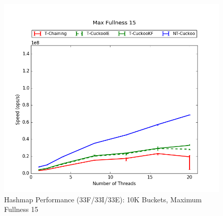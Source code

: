 \begin{figure}[H]
    \centering
	\begin{minipage}{0.5\textwidth}\includegraphics[width=\textwidth]{maps/15HM10K:F34,I33,E33.png} 
    \end{minipage}
	\begin{minipage}{0.4\textwidth}
    
    \end{minipage}
    \caption{Hashmap Performance (33F/33I/33E): 10K Buckets, Maximum Fullness 15}
\end{figure}

